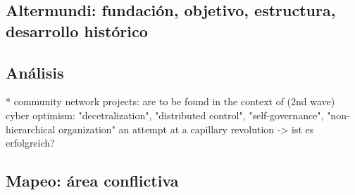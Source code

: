 \subsection{Altermundi: fundación, objetivo, estructura, desarrollo histórico}
\begin{comment}
* existe en su forma actual desde 2012
* objetivo: facilitar la construcción y el mantenimiento de redes comunitarias inalámbricas
* grupo básico de activistas + redes locales autónomas
* educar y concienciar: talleres, empoderamiento, el grupo central en papel consultativo
* la comunidad decide
\end{comment}


\subsection{Análisis}
* community network projects: are to be found in the context of (2nd wave) cyber optimism: "decetralization", "distributed control", "self-governance", "non-hierarchical organization"
an attempt at a capillary revolution -> ist es erfolgreich?
\begin{comment}
> framing the Internet alternately as lawless, anarchic,
> free, “a world where anyone, anywhere may express his or her beliefs, no matter how singular,
> without fear of being coerced into silence or conformity” (Barlow 1996) (p.1)

* la infraestructura está prerequisito para participación

## Conclusión del texto [Rieder2012]

> If technology won’t deliver us from the conundrums of
> governance, negotiation, and struggle, we
> may as well reengage politics proper[ly].

* sobre todo problemas sociales/políticos: organización de grupos (no tanto técnicos): ¿cómo decidimos como grupo? ¿quién hace qué? ¿quién está responsable?
* soluciones políticas para problemas políticos
\end{comment}

\subsection{Mapeo: área conflictiva}

